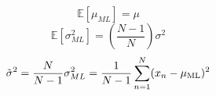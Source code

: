$$\mathbb{E}[\mu_{ML}]=\mu$$
$$\mathbb{E}[\sigma_{ML}^{2}]=\left( \frac{N-1}{N}\right)\sigma^2$$
$$\tilde{\sigma}^{2}=\frac{N}{N-1}\sigma^2_{ML}=\frac{1}{N-1}\sum_{n=1}^{N}(x_n - \mu _{\rm ML})^2$$
